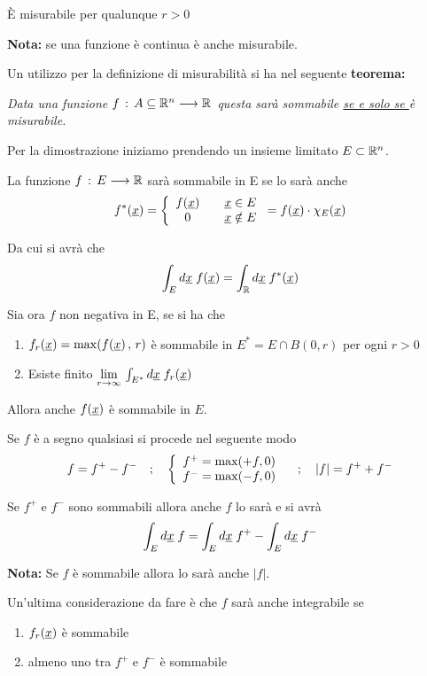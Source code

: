 È misurabile per qualunque $r>0$

\textbf{Nota:} se una funzione è continua è anche misurabile.

Un utilizzo per la definizione di misurabilità si ha nel seguente \textbf{teorema:}

\bigskip

\textit{Data una funzione $f \, : \, A\subseteq \mathbb{R}^{n} \longrightarrow \mathbb{R}^{}$ questa sarà sommabile \underline{se e solo se } è misurabile.}

\bigskip

Per la dimostrazione iniziamo prendendo un insieme limitato $E\subset\mathbb{R}^n$.

La funzione $f \, : \, E \longrightarrow \mathbb{R}$ sarà sommabile in E se lo sarà anche
\begin{align}
	f^*(\underline{x})= \left\{\begin{array}{cc} f(\underline{x}) \quad {}&\underline{x} \in E \\ 0 \quad &\underline{x} \notin E \end{array}\right. = f(\underline{x}) \cdot \chi_E(\underline{x})
\end{align}

Da cui si avrà che
\begin{align}
	\int_E d\underline{x} \; f(\underline{x}) = \int_{\mathbb{R}} d\underline{x} \; f^*(\underline{x})
\end{align}	

Sia ora $f$ non negativa in E, se si ha che

\begin{enumerate}
	\item $f_r(\underline{x})= \max (f(\underline{x})\, , \, r)$ è sommabile in $E^*=E \cap B(0,r)$ per ogni $r>0$
	\item Esiste finito $\underset{r \rightarrow \infty}{\lim} \, \int_{E^*} d\underline{x} \; f_r(\underline{x}) $
\end{enumerate} 

Allora anche $f(\underline{x})$ è sommabile in $E$.

Se $f$ è a segno qualsiasi si procede nel seguente modo
\begin{align}
	f= f^+ - f^- \quad ; \quad \left\{\begin{array}{cc} f^+ = \max(+f,0) \\ f^- = \max(-f,0) \end{array}\right. \quad ; \quad |f|= f^+ + f^-
\end{align}

Se $f^+$ e $f^-$ sono sommabili allora anche $f$ lo sarà e si avrà
\begin{align}
	\int_E d\underline{x} \; f = \int_E d\underline{x} \; f^+ - \int_E d\underline{x} \; f^-
\end{align}

\textbf{Nota:} Se $f$ è sommabile allora lo sarà anche $|f|$.

Un'ultima considerazione da fare è che $f$ sarà anche integrabile se
\begin{enumerate}
	\item $f_r(\underline{x})$ è sommabile
	\item almeno uno tra $f^+$ e $f^-$ è sommabile 
\end{enumerate}

